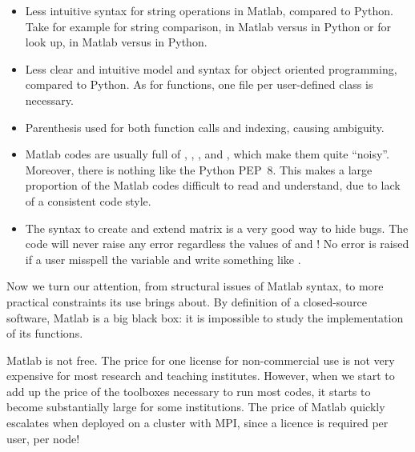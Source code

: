 \begin{itemize}
\item Less intuitive syntax for string operations in Matlab, compared to
Python. Take for example for string comparison,  in
Matlab versus  in Python or for look up,
 in Matlab versus 
in Python.
\item Less clear and intuitive model and syntax for object oriented
programming, compared to Python. As for functions, one file per user-defined
class is necessary.
\item Parenthesis used for both function calls and indexing, causing ambiguity.
\item Matlab codes are usually full of \codeinline{;}, ,
, \codeinline{\&\&} and \codeinline{||}, which make them quite
``noisy''.  Moreover, there is nothing like the Python PEP~8. This makes a
large proportion of the Matlab codes difficult to read and understand, due to
lack of a consistent code style.
\item The syntax  to create and extend matrix is a
very good way to hide bugs. The code 
will never raise any error regardless the values of  and
! No error is raised if a user misspell the variable
 and write something like .
\end{itemize}

Now we turn our attention, from structural issues of Matlab syntax, to more
practical constraints its use brings about.  By definition of a closed-source
software, Matlab is a big black box: it is impossible to study the
implementation of its functions.

Matlab is not free. The price for one license for non-commercial use is not
very expensive for most research and teaching institutes. However, when we
start to add up the price of the toolboxes necessary to run most codes, it
starts to become substantially large for some institutions.  The price of
Matlab quickly escalates when deployed on a cluster with MPI, since a licence
is required per user, per node!

